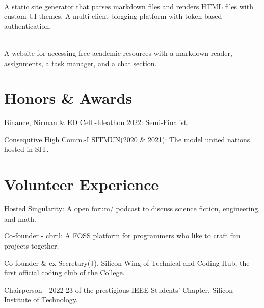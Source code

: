 \documentclass[]{assets/deedy-resume-openfont}
\begin{document}
\hfill {}\\
A static site generator that parses markdown files and renders HTML files with custom UI themes. A multi-client blogging platform with token-based authentication. \\
\sectionsep


\hfill {}\\
A website for accessing free academic resources with a markdown reader, assignments, a task manager, and a chat section.\\

\sectionsep
%
%
\section{Honors \& Awards}
\begin{tightemize}  
\item Binance, Nirman \& ED Cell -Ideathon 2022: Semi-Finalist.\\
\item Consequtive High Comm.-I SITMUN(2020 \& 2021): The model united nations hosted in SIT.
\end{tightemize}
\section{Volunteer Experience}
\begin{tightemize}  
\item Hosted Singularity: A open forum/ podcast to discuss science fiction, engineering, and math.\\
\item Co-founder - \href{https://cbrtl.github.io}{cbrtl}: A FOSS platform for programmers who like to craft fun projects together.\\
\item Co-founder \& ex-Secretary(J), Silicon Wing of Technical and Coding Hub, the first official coding club of the College.\\
\item Chairperson - 2022-23 of the prestigious IEEE Students’ Chapter, Silicon Institute of Technology.\\
\end{tightemize}
\ 
\end{document}
